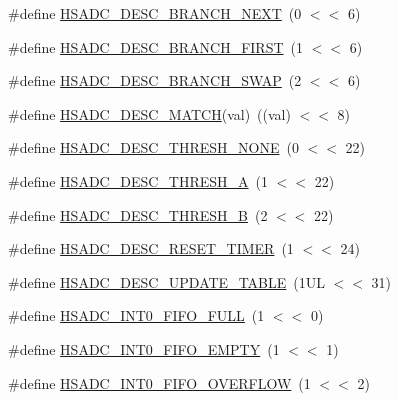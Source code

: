 \begin{DoxyCompactItemize}
\#define \hyperlink{group___h_s_a_d_c__18_x_x__43_x_x_gace04d08e17d8ef4aea5dcdd739977f52}{H\+S\+A\+D\+C\+\_\+\+D\+E\+S\+C\+\_\+\+B\+R\+A\+N\+C\+H\+\_\+\+N\+E\+XT}~(0 $<$$<$ 6)
\item 
\#define \hyperlink{group___h_s_a_d_c__18_x_x__43_x_x_ga2490e58198cd0d81251bb81a725d8d78}{H\+S\+A\+D\+C\+\_\+\+D\+E\+S\+C\+\_\+\+B\+R\+A\+N\+C\+H\+\_\+\+F\+I\+R\+ST}~(1 $<$$<$ 6)
\item 
\#define \hyperlink{group___h_s_a_d_c__18_x_x__43_x_x_gaf2255ed7cd48d9ffe08cde080aec9f30}{H\+S\+A\+D\+C\+\_\+\+D\+E\+S\+C\+\_\+\+B\+R\+A\+N\+C\+H\+\_\+\+S\+W\+AP}~(2 $<$$<$ 6)
\item 
\#define \hyperlink{group___h_s_a_d_c__18_x_x__43_x_x_gae778cc41c05fd0ab48557d5729cdca3e}{H\+S\+A\+D\+C\+\_\+\+D\+E\+S\+C\+\_\+\+M\+A\+T\+CH}(val)~((val) $<$$<$ 8)
\item 
\#define \hyperlink{group___h_s_a_d_c__18_x_x__43_x_x_gab8aa894027316458bbbc14e6c3eb0822}{H\+S\+A\+D\+C\+\_\+\+D\+E\+S\+C\+\_\+\+T\+H\+R\+E\+S\+H\+\_\+\+N\+O\+NE}~(0 $<$$<$ 22)
\item 
\#define \hyperlink{group___h_s_a_d_c__18_x_x__43_x_x_gac7411ef8756584fe30770ef9ee1bd5d2}{H\+S\+A\+D\+C\+\_\+\+D\+E\+S\+C\+\_\+\+T\+H\+R\+E\+S\+H\+\_\+A}~(1 $<$$<$ 22)
\item 
\#define \hyperlink{group___h_s_a_d_c__18_x_x__43_x_x_gad679e07226e8388ddbff3b47b34a0f15}{H\+S\+A\+D\+C\+\_\+\+D\+E\+S\+C\+\_\+\+T\+H\+R\+E\+S\+H\+\_\+B}~(2 $<$$<$ 22)
\item 
\#define \hyperlink{group___h_s_a_d_c__18_x_x__43_x_x_ga1dcff8ddcbf4b49f060bda8d1d8d5a75}{H\+S\+A\+D\+C\+\_\+\+D\+E\+S\+C\+\_\+\+R\+E\+S\+E\+T\+\_\+\+T\+I\+M\+ER}~(1 $<$$<$ 24)
\item 
\#define \hyperlink{group___h_s_a_d_c__18_x_x__43_x_x_gadb7ad7a7ee1d43b9bb873d19b318c26a}{H\+S\+A\+D\+C\+\_\+\+D\+E\+S\+C\+\_\+\+U\+P\+D\+A\+T\+E\+\_\+\+T\+A\+B\+LE}~(1\+U\+L $<$$<$ 31)
\item 
\#define \hyperlink{group___h_s_a_d_c__18_x_x__43_x_x_ga13e783f301fd2cd457c2679f4d2cc2cc}{H\+S\+A\+D\+C\+\_\+\+I\+N\+T0\+\_\+\+F\+I\+F\+O\+\_\+\+F\+U\+LL}~(1 $<$$<$ 0)
\item 
\#define \hyperlink{group___h_s_a_d_c__18_x_x__43_x_x_gafac0940c99898d7e391d1ac3c05ba719}{H\+S\+A\+D\+C\+\_\+\+I\+N\+T0\+\_\+\+F\+I\+F\+O\+\_\+\+E\+M\+P\+TY}~(1 $<$$<$ 1)
\item 
\#define \hyperlink{group___h_s_a_d_c__18_x_x__43_x_x_gab3b9780b70691c1beb059b701e29e6b3}{H\+S\+A\+D\+C\+\_\+\+I\+N\+T0\+\_\+\+F\+I\+F\+O\+\_\+\+O\+V\+E\+R\+F\+L\+OW}~(1 $<$$<$ 2)

\end{DoxyCompactItemize}

